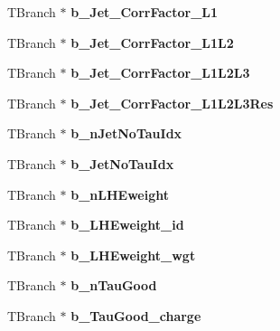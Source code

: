 \begin{DoxyCompactItemize}
\hypertarget{classMiniTree_ae8c7ada7484a7608d359a2dbec9c12ab}{}\label{classMiniTree_ae8c7ada7484a7608d359a2dbec9c12ab} 
T\+Branch $\ast$ {\bfseries b\+\_\+\+Jet\+\_\+\+Corr\+Factor\+\_\+\+L1}
\item 
\hypertarget{classMiniTree_aa4f86ee2bcfde3dbddc2626a0966b861}{}\label{classMiniTree_aa4f86ee2bcfde3dbddc2626a0966b861} 
T\+Branch $\ast$ {\bfseries b\+\_\+\+Jet\+\_\+\+Corr\+Factor\+\_\+\+L1\+L2}
\item 
\hypertarget{classMiniTree_a9e3857cbfa1d0f8563142e0afdf02f0d}{}\label{classMiniTree_a9e3857cbfa1d0f8563142e0afdf02f0d} 
T\+Branch $\ast$ {\bfseries b\+\_\+\+Jet\+\_\+\+Corr\+Factor\+\_\+\+L1\+L2\+L3}
\item 
\hypertarget{classMiniTree_a486bd08e30083afa818606967b70b23a}{}\label{classMiniTree_a486bd08e30083afa818606967b70b23a} 
T\+Branch $\ast$ {\bfseries b\+\_\+\+Jet\+\_\+\+Corr\+Factor\+\_\+\+L1\+L2\+L3\+Res}
\item 
\hypertarget{classMiniTree_a6690d9211e391d295c5e66375f9442f4}{}\label{classMiniTree_a6690d9211e391d295c5e66375f9442f4} 
T\+Branch $\ast$ {\bfseries b\+\_\+n\+Jet\+No\+Tau\+Idx}
\item 
\hypertarget{classMiniTree_a46fd5d9adf6aa621a0ad201c5d429522}{}\label{classMiniTree_a46fd5d9adf6aa621a0ad201c5d429522} 
T\+Branch $\ast$ {\bfseries b\+\_\+\+Jet\+No\+Tau\+Idx}
\item 
\hypertarget{classMiniTree_aa4eb83fc9e67f354d1529eb617679234}{}\label{classMiniTree_aa4eb83fc9e67f354d1529eb617679234} 
T\+Branch $\ast$ {\bfseries b\+\_\+n\+L\+H\+Eweight}
\item 
\hypertarget{classMiniTree_aa04588001bda9bf18864fd6a55417298}{}\label{classMiniTree_aa04588001bda9bf18864fd6a55417298} 
T\+Branch $\ast$ {\bfseries b\+\_\+\+L\+H\+Eweight\+\_\+id}
\item 
\hypertarget{classMiniTree_af16880bdfd910526aed72b2d064d5531}{}\label{classMiniTree_af16880bdfd910526aed72b2d064d5531} 
T\+Branch $\ast$ {\bfseries b\+\_\+\+L\+H\+Eweight\+\_\+wgt}
\item 
\hypertarget{classMiniTree_ac42db259a6aa3d52099691fa447f7345}{}\label{classMiniTree_ac42db259a6aa3d52099691fa447f7345} 
T\+Branch $\ast$ {\bfseries b\+\_\+n\+Tau\+Good}
\item 
\hypertarget{classMiniTree_aa53b0b37404dabf7fe76d81b34c129f6}{}\label{classMiniTree_aa53b0b37404dabf7fe76d81b34c129f6} 
T\+Branch $\ast$ {\bfseries b\+\_\+\+Tau\+Good\+\_\+charge}
\item 
\hypertarget{classMiniTree_a58c8ad2e385805b12bb093225a9cbf4a}{}\label{classMiniTree_a58c8ad2e385805b12bb093225a9cbf4a} 

\end{DoxyCompactItemize}
